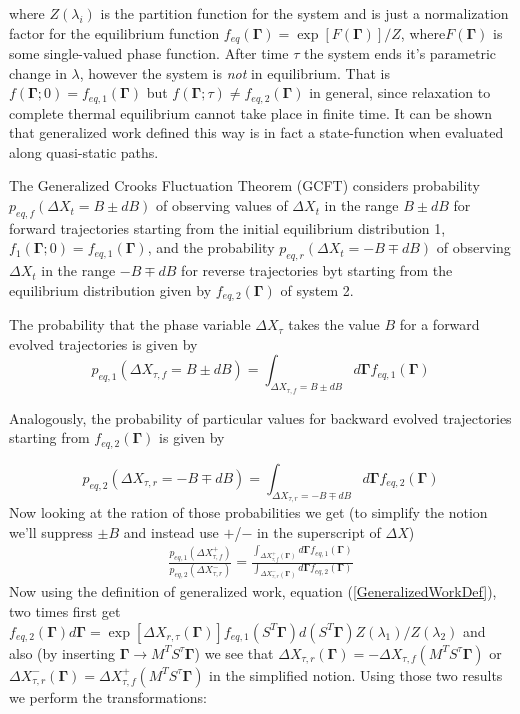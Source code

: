 \documentclass[a4paper,12pt]{article}
\begin{document}
where $Z(\lambda_i)$ is the partition function for the system and is just a normalization factor for the equilibrium function $f_{eq}(\bm{\Gamma}) =\exp[F(\bm{\Gamma})]/Z$, where$F(\bm{\Gamma})$ is some single-valued phase function. After time $\tau$ the system ends it's parametric change in $\lambda$, however the system is \textit{not} in equilibrium. That is $f(\bm{\Gamma};0)=f_{eq,1}(\bm{\Gamma})$ but $f(\bm{\Gamma};\tau)\neq f_{eq,2}(\bm{\Gamma})$ in general, since relaxation to complete thermal equilibrium cannot take place in finite time.
It can be shown that generalized work defined this way is in fact a state-function when evaluated along quasi-static paths.

The Generalized Crooks Fluctuation Theorem (GCFT) considers probability $p_{eq,f}(\Delta X_t = B \pm dB)$ of observing values of $\Delta X_t$ in the range $B\pm dB$ for forward trajectories starting from the initial equilibrium distribution 1, $f_1(\bm{\Gamma};0)=f_{eq,1}(\bm{\Gamma})$, and the probability $p_{eq,r}(\Delta X_t = -B \mp dB)$ of observing $\Delta X_t$ in the range $ -B\mp dB$ for reverse trajectories byt starting from the equilibrium distribution given by $f_{eq,2}(\bm{\Gamma})$ of system 2.

The probability that the phase variable $\Delta X_{\tau}$ takes the value $B$ for a forward evolved trajectories is given by
\begin{equation}
  p_{eq,1}(\Delta X_{\tau,f}=B\pm dB) = \int_{\Delta X_{\tau,f}=B\pm dB} d\bm{\Gamma} f_{eq,1}(\bm{\Gamma})
\end{equation}

Analogously, the probability of particular values for backward evolved trajectories starting from $f_{eq,2}(\bm{\Gamma})$ is given by

\begin{equation}
  p_{eq,2}(\Delta X_{\tau,r}=-B\mp dB) = \int_{\Delta X_{\tau,r}=-B\mp dB} d\bm{\Gamma} f_{eq,2}(\bm{\Gamma})
\end{equation}
Now looking at the ration of those probabilities we get (to simplify the notion we'll suppress $\pm B$ and instead use $+$/$-$ in the superscript of $\Delta X$)
\begin{equation}
\begin{aligned}
  \frac{p_{eq,1}(\Delta X_{\tau,f}^+)}{p_{eq,2}(\Delta X_{\tau,r}^-)}
= \frac{\int_{\Delta X_{\tau,f}^+(\bm{\Gamma})} d\bm{\Gamma} f_{eq,1}(\bm{\Gamma})}{\int_{\Delta X_{\tau,r}^-(\bm{\Gamma})} d\bm{\Gamma} f_{eq,2}(\bm{\Gamma})}
\end{aligned}
\end{equation}
Now using the definition of generalized work, equation (\ref{GeneralizedWorkDef}), two times first get $f_{eq,2}(\bm{\Gamma})d\bm{\Gamma}= \exp[\Delta X_{r,\tau}(\bm{\Gamma})] f_{eq,1}(S^T \bm{\Gamma}) d(S^T \bm{\Gamma}) Z(\lambda_1)/Z(\lambda_2) $ and also (by inserting $\bm{\Gamma} \to M^T S^{\tau} \bm{\Gamma}$) we see that $\Delta X_{\tau,r}(\bm{\Gamma}) = -\Delta X_{\tau,f}(M^T S^{\tau} \bm{\Gamma}) $ or $\Delta X_{\tau,r}^-(\bm{\Gamma}) = \Delta X_{\tau,f}^+(M^T S^{\tau} \bm{\Gamma}) $ in the simplified notion. Using those two results we perform the transformations:
\end{document}
